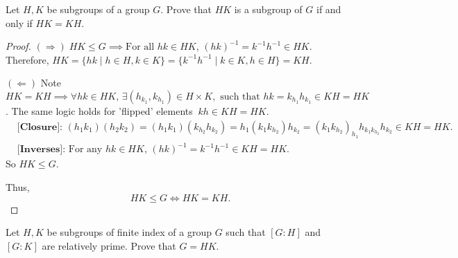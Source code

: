 \documentclass[addpoints,10pt]{exam}
\theoremstyle{plain}
\theoremstyle{definition}
\newtheorem{prob}[thm]{Problem}
\theoremstyle{plain}
\theoremstyle{plain}
\theoremstyle{definition}
\let\oldprob\prob
\let\endoldprob\endprob
\renewenvironment{prob}
  {\begin{singlespace}\oldprob}
  {\endoldprob\end{singlespace}}
\newcommand{\belowtitle}{\leavevmode\newline}
\newcommand{\Observe}{\text{Observe.}}
\newcommand{\IF}{\mathbf{(\Rightarrow)}}
\newcommand{\FI}{\mathbf{(\Leftarrow)}}
\begin{document}
\begin{prob}
Let $H,K$ be subgroups of a group $G$. Prove that $HK$ is a subgroup of $G$ if and only if $HK=KH$.
\end{prob}

\begin{proof}\belowtitle
  $\IF\;HK\leq G\implies\text{For all }hk\in HK$, $(hk)^{-1}=k^{-1}h^{-1}\in HK$. Therefore, $HK=\{hk\mid h\in H, k\in K\}=\{k^{-1}h^{-1}\mid k\in K,h\in H\}=KH$.

  $\FI$ Note $HK=KH\implies \forall hk\in HK,\,\exists (h_{k_{1}},k_{h_{1}})\in H\times K, \text{ such that }hk=k_{h_{1}}h_{k_{1}}\in KH=HK$. The same logic holds for 'flipped' elements$\;\;kh\in KH=HK$. \Observe
  \begin{align*}
    &\textbf{[Closure]: } (h_{1}k_{1})(h_{2}k_{2})=(h_{1}k_{1})(k_{h_{2}}h_{k_{2}})=h_{1}(k_{1}k_{h_{2}})h_{k_{2}}=(k_{1}k_{h_{2}})_{h_{1}}h_{k_{1}k_{h_{2}}}h_{k_{2}}\in KH=HK.\\
    &\textbf{[Inverses]: }\text{For any }hk\in HK,\,(hk)^{-1}=k^{-1}h^{-1}\in KH=HK.
  \end{align*}
  So $HK\leq G$.

  Thus,
  $$HK\leq G\iff HK=KH.$$
\end{proof}
\newpage
\begin{prob}
Let $H,K$ be subgroups of finite index of a group $G$ such that $[G:H]$ and $[G:K]$ are relatively prime. Prove that $G=HK$.
\end{prob}
\end{document}
